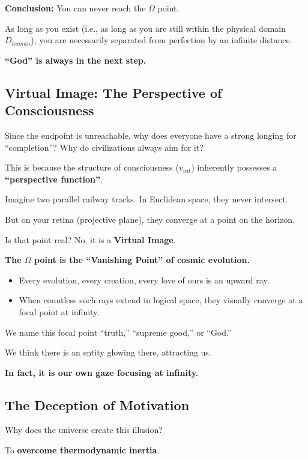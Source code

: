 \textbf{Conclusion:} You can never reach the $\Omega$ point.

As long as you exist (i.e., as long as you are still within the physical domain $D_{human}$), you are necessarily separated from perfection by an infinite distance.

\textbf{``God'' is always in the next step.}

\subsection{Virtual Image: The Perspective of Consciousness}

Since the endpoint is unreachable, why does everyone have a strong longing for ``completion''? Why do civilizations always aim for it?

This is because the structure of consciousness ($v_{int}$) inherently possesses a \textbf{``perspective function''}.

Imagine two parallel railway tracks. In Euclidean space, they never intersect.

But on your retina (projective plane), they converge at a point on the horizon.

Is that point real? No, it is a \textbf{Virtual Image}.

\textbf{The $\Omega$ point is the ``Vanishing Point'' of cosmic evolution.}

\begin{itemize}
\item Every evolution, every creation, every love of ours is an upward ray.

\item When countless such rays extend in logical space, they visually converge at a focal point at infinity.
\end{itemize}

We name this focal point ``truth,'' ``supreme good,'' or ``God.''

We think there is an entity glowing there, attracting us.

\textbf{In fact, it is our own gaze focusing at infinity.}

\subsection{The Deception of Motivation}

Why does the universe create this illusion?

To \textbf{overcome thermodynamic inertia}.


